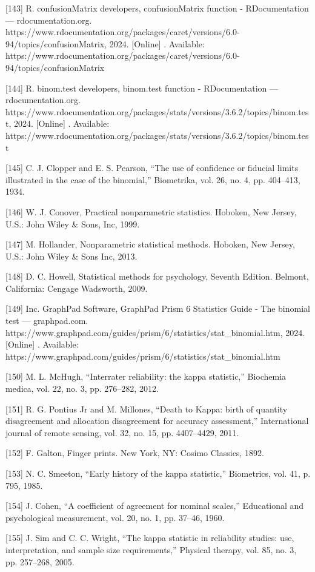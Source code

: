 \documentclass[sn-mathphys-num]{sn-jnl}%
\begin{document}
[143] R. confusionMatrix developers, confusionMatrix function - RDocumentation — rdocumentation.org. https://www.rdocumentation.org/packages/caret/versions/6.0-94/topics/confusionMatrix, 2024. [Online] . Available: https://www.rdocumentation.org/packages/caret/versions/6.0-94/topics/confusionMatrix

[144] R. binom.test developers, binom.test function - RDocumentation — rdocumentation.org. https://www.rdocumentation.org/packages/stats/versions/3.6.2/topics/binom.test, 2024. [Online] . Available: https://www.rdocumentation.org/packages/stats/versions/3.6.2/topics/binom.test

[145] C. J. Clopper and E. S. Pearson, “The use of confidence or fiducial limits illustrated in the case of the binomial,” Biometrika, vol. 26, no. 4, pp. 404–413, 1934.

[146] W. J. Conover, Practical nonparametric statistics. Hoboken, New Jersey, U.S.: John Wiley & Sons, Inc, 1999.

[147] M. Hollander, Nonparametric statistical methods. Hoboken, New Jersey, U.S.: John Wiley & Sons Inc, 2013.

[148] D. C. Howell, Statistical methods for psychology, Seventh Edition. Belmont, California: Cengage Wadsworth, 2009.

[149] Inc. GraphPad Software, GraphPad Prism 6 Statistics Guide - The binomial test — graphpad.com. https://www.graphpad.com/guides/prism/6/statistics/stat_binomial.htm, 2024. [Online] . Available: https://www.graphpad.com/guides/prism/6/statistics/stat_binomial.htm

[150] M. L. McHugh, “Interrater reliability: the kappa statistic,” Biochemia medica, vol. 22, no. 3, pp. 276–282, 2012.

[151] R. G. Pontius Jr and M. Millones, “Death to Kappa: birth of quantity disagreement and allocation disagreement for accuracy assessment,” International journal of remote sensing, vol. 32, no. 15, pp. 4407–4429, 2011.

[152] F. Galton, Finger prints. New York, NY: Cosimo Classics, 1892.

[153] N. C. Smeeton, “Early history of the kappa statistic,” Biometrics, vol. 41, p. 795, 1985.

[154] J. Cohen, “A coefficient of agreement for nominal scales,” Educational and psychological measurement, vol. 20, no. 1, pp. 37–46, 1960.

[155] J. Sim and C. C. Wright, “The kappa statistic in reliability studies: use, interpretation, and sample size requirements,” Physical therapy, vol. 85, no. 3, pp. 257–268, 2005.
\end{document}
